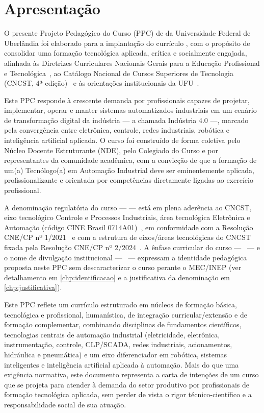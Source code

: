 \chapter{Apresentação}

O presente Projeto Pedagógico do Curso (PPC) de \ppccurso da Universidade Federal de Uberlândia foi elaborado para a implantação do currículo \ppcversao, com o propósito de consolidar uma formação tecnológica aplicada, crítica e socialmente engajada, alinhada às Diretrizes Curriculares Nacionais Gerais para a Educação Profissional e Tecnológica~\cite{cne_cp_1_2021}, ao Catálogo Nacional de Cursos Superiores de Tecnologia (CNCST, 4ª edição)~\cite{mec_cncst_2024} e às orientações institucionais da UFU~\cite{ufu_guia_ppc_2021}.

Este PPC responde à crescente demanda por profissionais capazes de projetar, implementar, operar e manter sistemas automatizados industriais em um cenário de transformação digital da indústria — a chamada Indústria 4.0 —, marcado pela convergência entre eletrônica, controle, redes industriais, robótica e inteligência artificial aplicada. O curso foi construído de forma coletiva pelo Núcleo Docente Estruturante (NDE), pelo Colegiado do Curso e por representantes da comunidade acadêmica, com a convicção de que a formação de um(a) Tecnólogo(a) em Automação Industrial deve ser eminentemente aplicada, profissionalizante e orientada por competências diretamente ligadas ao exercício profissional.

A denominação regulatória do curso — \ppccurso — está em plena aderência ao CNCST, eixo tecnológico Controle e Processos Industriais, área tecnológica Eletrônica e Automação (código CINE Brasil 0714A01)~\cite{inep_cine_brasil_622_2025}, em conformidade com a Resolução CNE/CP nº 1/2021~\cite{cne_cp_1_2021} e com a estrutura de eixos/áreas tecnológicas do CNCST fixada pela Resolução CNE/CP nº 2/2024~\cite{cne_cp_2_2024}. A ênfase curricular do curso — \ppcenfasecurricular\ — e o nome de divulgação institucional — \ppccursomercadologico\ — expressam a identidade pedagógica proposta neste PPC sem descaracterizar o curso perante o MEC/INEP (ver detalhamento em \autoref{chp:identificacao} e a justificativa da denominação em \autoref{chp:justificativa}).

Este PPC reflete um currículo estruturado em núcleos de formação básica, tecnológica e profissional, humanística, de integração curricular/extensão e de formação complementar, combinando disciplinas de fundamentos científicos, tecnologias centrais de automação industrial (eletricidade, eletrônica, instrumentação, controle, CLP/SCADA, redes industriais, acionamentos, hidráulica e pneumática) e um eixo diferenciador em robótica, sistemas inteligentes e inteligência artificial aplicada à automação. Mais do que uma exigência normativa, este documento representa a carta de intenções de um curso que se projeta para atender à demanda do setor produtivo por profissionais de formação tecnológica aplicada, sem perder de vista o rigor técnico-científico e a responsabilidade social de sua atuação.

